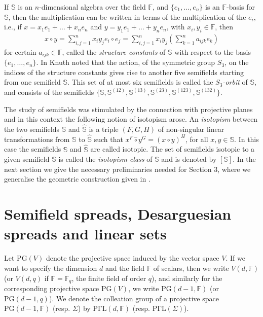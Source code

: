 \documentclass[12pt]{amsart}
\def\F{\mathbb{F}}
\def\PG{\mathrm{PG}}
\def\S{\mathbb{S}}
\begin{document}
If $\mathbb S$ is an $n$-dimensional algebra over the field ${\mathbb F}$, and $\{e_1,\ldots, e_n\}$ is an $\mathbb F$-basis for $\mathbb S$, then the multiplication can be written in terms of the multiplication of the $e_i$, i.e., if $x=x_1e_1+\ldots + x_ne_n$ and $y=y_1e_1+\ldots + y_ne_n$, with $x_i,y_i\in {\mathbb F}$, then 
\begin{eqnarray}
x\circ y =\sum_{i,j=1}^{n}x_iy_je_i\circ e_j = \sum_{i,j=1}^{n}x_iy_j \left (\sum_{k=1}^n a_{ijk} e_k\right )
\end{eqnarray}
for certain $a_{ijk} \in {\mathbb F}$, called the {\it structure constants} of $\mathbb S$ with respect to the basis $\{e_1,\ldots, e_n\}$.
In \cite{Knuth1965} Knuth noted that the action, of the symmetric group $S_3$, on the indices of the structure constants gives rise to another five semifields starting from one semifield $\mathbb S$. This set of at most six semifields is called the {\it $S_3$-orbit} of $\mathbb S$, and consists of the semifields $\{{\mathbb S},{\mathbb S}^{(12)},{\mathbb S}^{(13)},{\mathbb S}^{(23)},{\mathbb S}^{(123)},{\mathbb S}^{(132)}\}$.

The study of semifields was stimulated by the connection with projective planes and in this context the following notion of isotopism arose. An {\it isotopism} between the two semifields $\S$ and $\hat{\S}$ is a triple $(F,G,H)$ of non-singular linear transformations from $\S$ to $\hat{\S}$ such that $x^F\hat{\circ} y^G=(x\circ y)^H$, for all $x,y\in \S$. In this case the semifields $\S$ and $\hat{\S}$ are called isotopic. The set of semifields isotopic to a given semifield $\S$ is called the {\it isotopism class} of $\S$ and is denoted by $[\S]$.
In the next section we give the necessary preliminaries needed for Section 3, where we generalise the geometric construction given in \cite{BEL}.
\section{Semifield spreads, Desarguesian spreads and linear sets}

Let $\PG(V)$ denote the projective space induced by the vector space $V$. If we want to specify the dimension $d$ and the field $\F$ of scalars, then we write $V(d,\F)$ (or $V(d,q)$ if $\F = \F_q$, the finite field of order $q$), and similarly for the corresponding projective space $\PG(V)$, we write $\PG(d-1,\F)$ (or $\PG(d-1,q)$). We denote the colleation group of a projective space $\PG(d-1,\F)$ (resp. $\Sigma$) by ${\mathrm{P\Gamma L}}(d,\F)$ (resp. ${\mathrm{P\Gamma L}}(\Sigma)$). 
\end{document}
